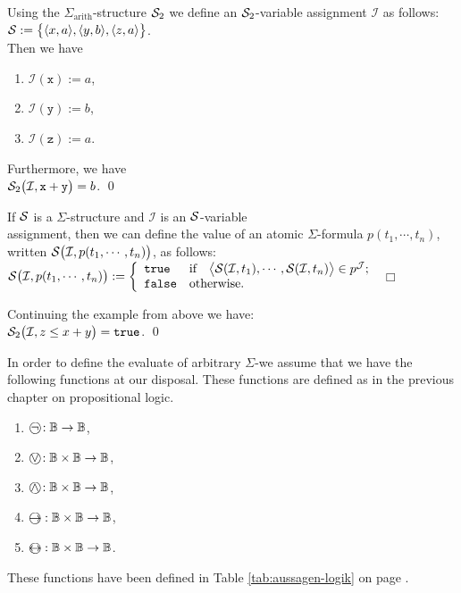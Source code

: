 \example
Using the $\Sigma_{\mathrm{arith}}$-structure $\mathcal{S}_{2}$
we define an  $\mathcal{S}_{2}$-variable assignment  $\mathcal{I}$ as follows:
\\[0.2cm]
\hspace*{1.3cm}
$\mathcal{S} := \bigl\{ \pair(x,a), \pair(y,b), \pair(z,a)\bigr\}$.
\\[0.2cm]
Then we have
\begin{enumerate}
\item $\mathcal{I}(\mathtt{x}) := a$,
\item $\mathcal{I}(\mathtt{y}) := b$,
\item $\mathcal{I}(\mathtt{z}) := a$.
\end{enumerate}
Furthermore, we have \\[0.2cm]
\hspace*{1.3cm}  $\mathcal{S}_2\bigl(\mathcal{I}, \mathtt{x} + \mathtt{y} \bigr) = b$. \qed

\begin{Definition}
If  $\mathcal{S}$ is a  $\Sigma$-structure and $\mathcal{I}$ is an $\mathcal{S}$-variable \\
assignment,
then we can define the value of an atomic  $\Sigma$-formula
$p(t_1, \cdots, t_n)$, written  $\mathcal{S}\bigl(\mathcal{I}, p(t_1, \cdots, t_n) \bigr)$, as follows: 
\\[0.2cm]
\hspace*{1.3cm} 
$\mathcal{S}\bigl(\mathcal{I}, p(t_1,\cdots,t_n)\bigr) := \left\{
\begin{array}{ll}
 \mathtt{true} & \mbox{if} \quad 
    \bigl\langle \mathcal{S}(\mathcal{I}, t_1), \cdots, \mathcal{S}(\mathcal{I}, t_n) \bigr\rangle \in
    p^\mathcal{J}; \\
 \mathtt{false} & \mbox{otherwise}.
\end{array}
\right.
$
 \hspace*{\fill} $\Box$
\end{Definition}

\example
Continuing the example from above we have: \\[0.2cm]
\hspace*{1.3cm}  $\mathcal{S}_2\bigl(\mathcal{I},z \leq x + y \bigr) = \mathtt{true}$. \qed
\vspace{0.1cm}

In order to define the evaluate of arbitrary  $\Sigma$-\formulae we assume that we have the
following functions at our disposal.  These functions are defined as in the previous chapter 
on propositional logic.
\begin{enumerate}
\item $\circneg: \mathbb{B} \rightarrow \mathbb{B}$,
\item $\circvee: \mathbb{B} \times \mathbb{B} \rightarrow \mathbb{B}$,
\item $\circwedge: \mathbb{B} \times \mathbb{B} \rightarrow \mathbb{B}$,
\item $\circright: \mathbb{B} \times \mathbb{B} \rightarrow \mathbb{B}$,
\item $\circleftright: \mathbb{B} \times \mathbb{B} \rightarrow \mathbb{B}$.
\end{enumerate}
These functions have been defined in Table 
\ref{tab:aussagen-logik} on page \pageref{tab:aussagen-logik}. 

